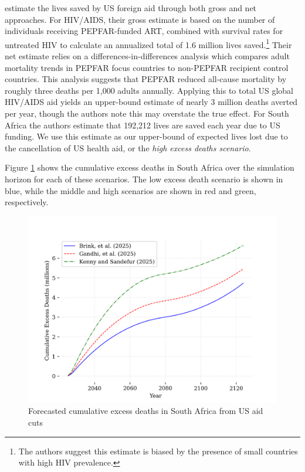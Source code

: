 \documentclass[letterpaper,12pt]{article}
\theoremstyle{definition}
\begin{document}
\begin{spacing}{1.5}
\citet{KS2025} estimate the lives saved by US foreign aid through both gross and net approaches. For HIV/AIDS, their gross estimate is based on the number of individuals receiving PEPFAR-funded ART, combined with survival rates for untreated HIV to calculate an annualized total of \num{1.6} million lives saved.\footnote{The authors suggest this estimate is biased by the presence of small countries with high HIV prevalence.} Their net estimate relies on a differences-in-differences analysis which compares adult mortality trends in PEPFAR focus countries to non-PEPFAR recipient control countries. This analysis suggests that PEPFAR reduced all-cause mortality by roughly three deaths per 1,000 adults annually. Applying this to total US global HIV/AIDS aid yields an upper-bound estimate of nearly 3 million deaths averted per year, though the authors note this may overstate the true effect. For South Africa the authors estimate that 192,212 lives are saved each year due to US funding. We use this estimate as our upper-bound of expected lives lost due to the cancellation of US health aid, or the \textit{high excess deaths scenario}.

Figure \ref{fig:cumDeaths} shows the cumulative excess deaths in South Africa over the simulation horizon for each of these scenarios. The low excess death scenario is shown in blue, while the middle and high scenarios are shown in red and green, respectively.

\begin{figure}[H]
    \caption{Forecasted cumulative excess deaths in South Africa from US aid cuts}
    \label{fig:cumDeaths}
    \centering
    \includegraphics[scale=0.75]{./tables_figures/cumulative_excess_deaths.png}
\end{figure}


\end{spacing}
\end{document}
